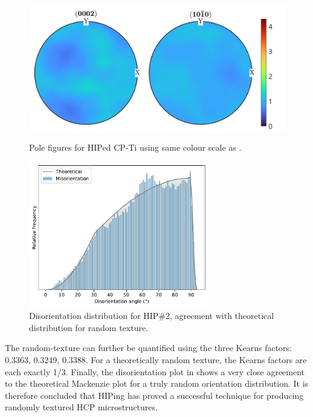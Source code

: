 \begin{figure}[h!]
\centering
  \includegraphics[width=\textwidth]{Figures/pf_HIP_TLS.jpg}
  \caption{Pole figures for HIPed CP-Ti using same colour scale as .\label{fig.pfHIP}}
  \vspace{\baselineskip}
  \includegraphics[width=0.7\textwidth]{Figures/disorientationDist.pdf}
  \caption{Disorientation distribution for HIP\#2, agreement with theoretical distribution for random texture.\label{fig.disorientationPlot}}
\end{figure}

The random-texture can further be quantified using the three Kearns factors: 0.3363, 0.3249, 0.3388.
For a theoretically random texture, the Kearns factors are each exactly 1/3.
Finally, the disorientation plot in  shows a very close agreement to the theoretical Mackenzie plot for a truly random orientation distribution.
It is therefore concluded that HIPing has proved a successful technique for producing randomly textured HCP microstructures.


